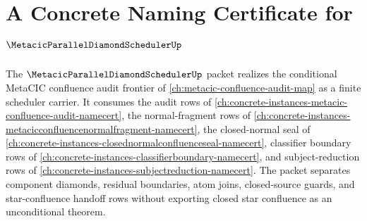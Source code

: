 \chapter{A Concrete Naming Certificate for $\MetacicParallelDiamondSchedulerUp$}
\label{ch:concrete-instances-metacic-parallel-diamond-scheduler-namecert}

The $\MetacicParallelDiamondSchedulerUp$ packet realizes the conditional MetaCIC confluence audit frontier of \autoref{ch:metacic-confluence-audit-map} as a finite scheduler carrier. It consumes the audit rows of \autoref{ch:concrete-instances-metacic-confluence-audit-namecert}, the normal-fragment rows of \autoref{ch:concrete-instances-metacicconfluencenormalfragment-namecert}, the closed-normal seal of \autoref{ch:concrete-instances-closednormalconfluenceseal-namecert}, classifier boundary rows of \autoref{ch:concrete-instances-classifierboundary-namecert}, and subject-reduction rows of \autoref{ch:concrete-instances-subjectreduction-namecert}. The packet separates component diamonds, residual boundaries, atom joins, closed-source guards, and star-confluence handoff rows without exporting closed star confluence as an unconditional theorem.

